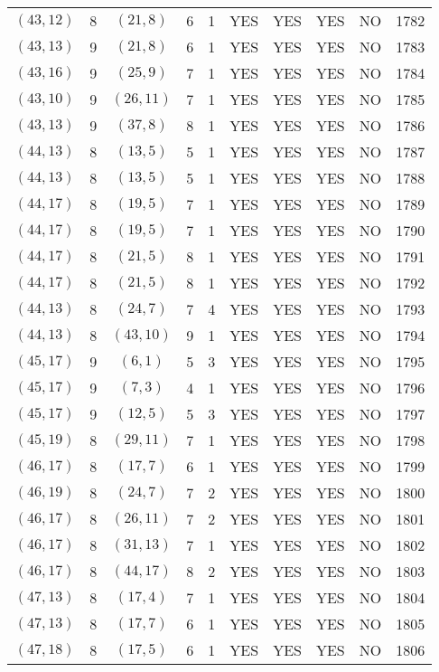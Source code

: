 \begin{longtable}{|c|c|c|c|c|c|c|c|c|c|}
$(43, 12)$ & 8 & $(21, 8)$ & 6 & 1 & YES & YES & YES & NO & 1782\\
$(43, 13)$ & 9 & $(21, 8)$ & 6 & 1 & YES & YES & YES & NO & 1783\\
$(43, 16)$ & 9 & $(25, 9)$ & 7 & 1 & YES & YES & YES & NO & 1784\\
$(43, 10)$ & 9 & $(26, 11)$ & 7 & 1 & YES & YES & YES & NO & 1785\\
$(43, 13)$ & 9 & $(37, 8)$ & 8 & 1 & YES & YES & YES & NO & 1786\\
$(44, 13)$ & 8 & $(13, 5)$ & 5 & 1 & YES & YES & YES & NO & 1787\\
$(44, 13)$ & 8 & $(13, 5)$ & 5 & 1 & YES & YES & YES & NO & 1788\\
$(44, 17)$ & 8 & $(19, 5)$ & 7 & 1 & YES & YES & YES & NO & 1789\\
$(44, 17)$ & 8 & $(19, 5)$ & 7 & 1 & YES & YES & YES & NO & 1790\\
$(44, 17)$ & 8 & $(21, 5)$ & 8 & 1 & YES & YES & YES & NO & 1791\\
$(44, 17)$ & 8 & $(21, 5)$ & 8 & 1 & YES & YES & YES & NO & 1792\\
$(44, 13)$ & 8 & $(24, 7)$ & 7 & 4 & YES & YES & YES & NO & 1793\\
$(44, 13)$ & 8 & $(43, 10)$ & 9 & 1 & YES & YES & YES & NO & 1794\\
$(45, 17)$ & 9 & $(6, 1)$ & 5 & 3 & YES & YES & YES & NO & 1795\\
$(45, 17)$ & 9 & $(7, 3)$ & 4 & 1 & YES & YES & YES & NO & 1796\\
$(45, 17)$ & 9 & $(12, 5)$ & 5 & 3 & YES & YES & YES & NO & 1797\\
$(45, 19)$ & 8 & $(29, 11)$ & 7 & 1 & YES & YES & YES & NO & 1798\\
$(46, 17)$ & 8 & $(17, 7)$ & 6 & 1 & YES & YES & YES & NO & 1799\\
$(46, 19)$ & 8 & $(24, 7)$ & 7 & 2 & YES & YES & YES & NO & 1800\\
$(46, 17)$ & 8 & $(26, 11)$ & 7 & 2 & YES & YES & YES & NO & 1801\\
$(46, 17)$ & 8 & $(31, 13)$ & 7 & 1 & YES & YES & YES & NO & 1802\\
$(46, 17)$ & 8 & $(44, 17)$ & 8 & 2 & YES & YES & YES & NO & 1803\\
$(47, 13)$ & 8 & $(17, 4)$ & 7 & 1 & YES & YES & YES & NO & 1804\\
$(47, 13)$ & 8 & $(17, 7)$ & 6 & 1 & YES & YES & YES & NO & 1805\\
$(47, 18)$ & 8 & $(17, 5)$ & 6 & 1 & YES & YES & YES & NO & 1806\\

\end{longtable}
